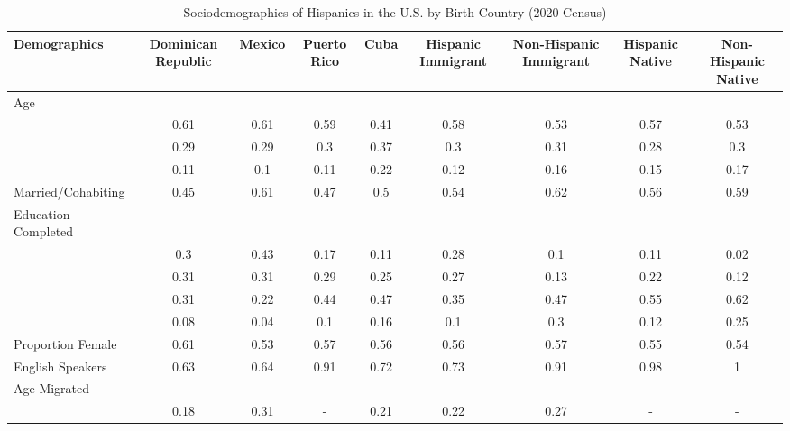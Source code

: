 \begin{table}[ht]
\centering
\caption{Sociodemographics of Hispanics in the U.S. by Birth Country (2020 Census)} 
\begingroup\small
\begin{tabular}{>{\raggedright\arraybackslash}p{3cm}|cccccccc}
  \hline
Demographics & Dominican Republic & Mexico & Puerto Rico & Cuba & Hispanic Immigrant & Non-Hispanic Immigrant & Hispanic Native & Non-Hispanic Native \\ 
  \hline
Age &  &  &  &  &  &  &  &  \\ 
  \multicolumn{1}{>{\raggedleft\arraybackslash}p{3cm}|}{\makebox[3cm][r]{60 - 69 }}& 0.61 & 0.61 & 0.59 & 0.41 & 0.58 & 0.53 & 0.57 & 0.53 \\ 
  \multicolumn{1}{>{\raggedleft\arraybackslash}p{3cm}|}{\makebox[3cm][r]{70 - 79 }}& 0.29 & 0.29 & 0.3 & 0.37 & 0.3 & 0.31 & 0.28 & 0.3 \\ 
  \multicolumn{1}{>{\raggedleft\arraybackslash}p{3cm}|}{\makebox[3cm][r]{80 - 89 }}& 0.11 & 0.1 & 0.11 & 0.22 & 0.12 & 0.16 & 0.15 & 0.17 \\ 
  Married/Cohabiting & 0.45 & 0.61 & 0.47 & 0.5 & 0.54 & 0.62 & 0.56 & 0.59 \\ 
  Education Completed &  &  &  &  &  &  &  &  \\ 
  \multicolumn{1}{>{\raggedleft\arraybackslash}p{3cm}|}{\makebox[3cm][r]{Less than Primary }}& 0.3 & 0.43 & 0.17 & 0.11 & 0.28 & 0.1 & 0.11 & 0.02 \\ 
  \multicolumn{1}{>{\raggedleft\arraybackslash}p{3cm}|}{\makebox[3cm][r]{Primary }}& 0.31 & 0.31 & 0.29 & 0.25 & 0.27 & 0.13 & 0.22 & 0.12 \\ 
  \multicolumn{1}{>{\raggedleft\arraybackslash}p{3cm}|}{\makebox[3cm][r]{Secondary }}& 0.31 & 0.22 & 0.44 & 0.47 & 0.35 & 0.47 & 0.55 & 0.62 \\ 
  \multicolumn{1}{>{\raggedleft\arraybackslash}p{3cm}|}{\makebox[3cm][r]{University }}& 0.08 & 0.04 & 0.1 & 0.16 & 0.1 & 0.3 & 0.12 & 0.25 \\ 
  Proportion Female & 0.61 & 0.53 & 0.57 & 0.56 & 0.56 & 0.57 & 0.55 & 0.54 \\ 
  English Speakers & 0.63 & 0.64 & 0.91 & 0.72 & 0.73 & 0.91 & 0.98 & 1 \\ 
  Age Migrated &  &  &  &  &  &  &  &  \\ 
  \multicolumn{1}{>{\raggedleft\arraybackslash}p{3cm}|}{\makebox[3cm][r]{Less than 15 }}& 0.18 & 0.31 & - & 0.21 & 0.22 & 0.27 & - & - \\ 

\end{tabular}
\end{table}
